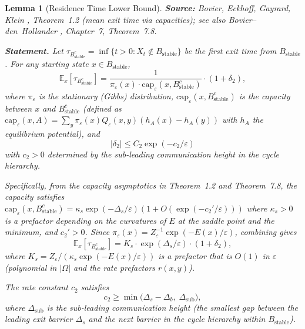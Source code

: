 \documentclass[11pt]{article}
\newtheorem{lemma}{Lemma}
\newcommand{\eps}{\varepsilon}
\newcommand{\Ds}{\Delta_s}
\newcommand{\Db}{\Delta_b}
\newcommand{\Bstable}{B_{\mathrm{stable}}}
\begin{document}
\begin{lemma}[Residence Time Lower Bound]\label{lem:residence}
\textbf{Source:} Bovier, Eckhoff, Gayrard, Klein \cite{BEGK02},
Theorem~1.2 (mean exit time via capacities); see also
Bovier--den~Hollander \cite{BdH15}, Chapter~7, Theorem~7.8.

\medskip
\textbf{Statement.}
Let $\tau_{\Bstable^c} = \inf\{t > 0 : X_t \notin \Bstable\}$ be
the first exit time from $\Bstable$. For any starting state
$x \in \Bstable$,
\begin{equation}\label{eq:mean-exit}
  \mathbb{E}_x[\tau_{\Bstable^c}]
  = \frac{1}{\pi_\eps(x) \cdot \mathrm{cap}_\eps(x, \Bstable^c)}
    \cdot (1 + \delta_2),
\end{equation}
where $\pi_\eps$ is the stationary (Gibbs) distribution,
$\mathrm{cap}_\eps(x, \Bstable^c)$ is the capacity between $x$
and $\Bstable^c$ (defined as
$\mathrm{cap}_\eps(x,A) = \sum_{y} \pi_\eps(x) Q_\eps(x,y)
(h_A(x) - h_A(y))$ with $h_A$ the equilibrium potential), and
\begin{equation}\label{eq:delta2}
  |\delta_2| \leq C_2 \exp(-c_2 / \eps)
\end{equation}
with $c_2 > 0$ determined by the sub-leading communication height
in the cycle hierarchy.

Specifically, from the capacity asymptotics in
\cite{BEGK02} Theorem~1.2 and \cite{BdH15} Theorem~7.8,
the capacity satisfies
$\mathrm{cap}_\eps(x, \Bstable^c) = \kappa_s \exp(-\Ds/\eps)
(1 + O(\exp(-c_2'/\eps)))$
where $\kappa_s > 0$ is a prefactor depending on the curvatures of
$E$ at the saddle point and the minimum, and $c_2' > 0$.
Since $\pi_\eps(x) = Z_\eps^{-1} \exp(-E(x)/\eps)$, combining gives
\begin{equation}\label{eq:mean-exit-sharp}
  \mathbb{E}_x[\tau_{\Bstable^c}]
  = K_s \cdot \exp(\Ds / \eps) \cdot (1 + \delta_2),
\end{equation}
where $K_s = Z_\eps / (\kappa_s \exp(-E(x)/\eps))$ is a prefactor
that is $O(1)$ in $\eps$ (polynomial in $|\Omega|$ and the rate
prefactors $r(x,y)$).

The rate constant $c_2$ satisfies
\begin{equation}\label{eq:c2-bound}
  c_2 \geq \min\bigl(\Ds - \Db,\; \Delta_{\mathrm{sub}}\bigr),
\end{equation}
where $\Delta_{\mathrm{sub}}$ is the sub-leading communication height
(the smallest gap between the leading exit barrier $\Ds$ and the next
barrier in the cycle hierarchy within $\Bstable$).


\end{lemma}
\end{document}
